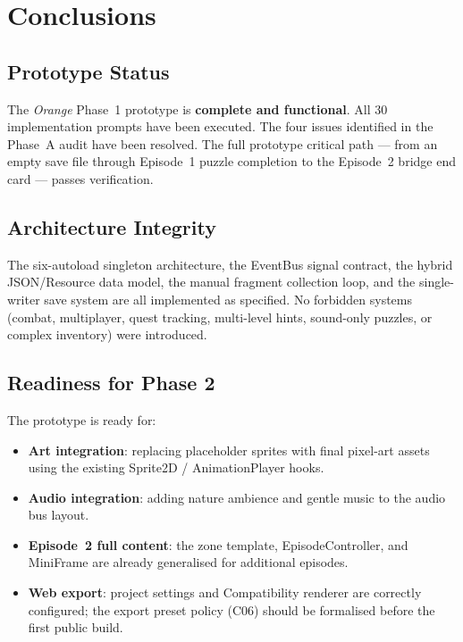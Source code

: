 \documentclass[12pt, a4paper]{article}
\begin{document}
\section{Conclusions}

\subsection{Prototype Status}

The \textit{Orange} Phase~1 prototype is \textbf{complete and functional}.
All 30 implementation prompts have been executed. The four issues identified
in the Phase~A audit have been resolved. The full prototype critical path —
from an empty save file through Episode~1 puzzle completion to the Episode~2
bridge end card — passes verification.

\subsection{Architecture Integrity}

The six-autoload singleton architecture, the EventBus signal contract, the
hybrid JSON/Resource data model, the manual fragment collection loop, and the
single-writer save system are all implemented as specified. No forbidden
systems (combat, multiplayer, quest tracking, multi-level hints,
sound-only puzzles, or complex inventory) were introduced.

\subsection{Readiness for Phase 2}

The prototype is ready for:

\begin{itemize}
  \item \textbf{Art integration}: replacing placeholder sprites with final
        pixel-art assets using the existing Sprite2D / AnimationPlayer hooks.
  \item \textbf{Audio integration}: adding nature ambience and gentle music
        to the audio bus layout.
  \item \textbf{Episode~2 full content}: the zone template, EpisodeController,
        and MiniFrame are already generalised for additional episodes.
  \item \textbf{Web export}: project settings and Compatibility renderer are
        correctly configured; the export preset policy (C06) should be
        formalised before the first public build.
\end{itemize}
\end{document}
